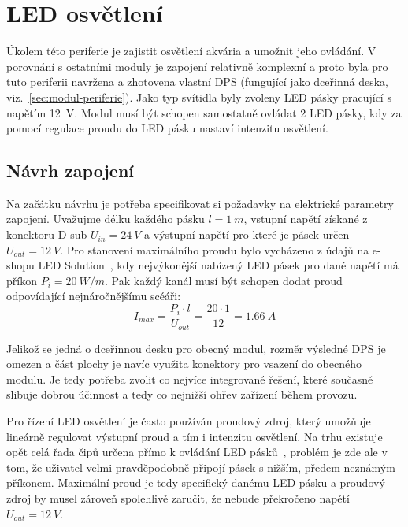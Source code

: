 \section{LED osvětlení}
\label{sec:perif-led-osvetleni}

    Úkolem této periferie je zajistit osvětlení akvária a umožnit jeho ovládání. V porovnání s ostatními moduly je zapojení relativně komplexní a proto byla pro tuto periferii navržena a zhotovena vlastní DPS (fungující jako dceřinná deska, viz.~\ref{sec:modul-periferie}). Jako typ svítidla byly zvoleny LED pásky pracující s napětím \qty{12}{V}. Modul musí být schopen samostatně ovládat 2 LED pásky, kdy za pomocí regulace proudu do LED pásku nastaví intenzitu osvětlení. 

\subsection{Návrh zapojení}
    Na začátku návrhu je potřeba specifikovat si požadavky na elektrické parametry zapojení. Uvažujme délku každého pásku \(l=\qty{1}{m}\), vstupní napětí získané z konektoru D-sub \(U_{in} =\qty{24}{V}\) a výstupní napětí pro které je pásek určen \(U_{out} =\qty{12}{V}\). Pro stanovení maximálního proudu bylo vycházeno z údajů na e-shopu LED Solution~\cite{eshop-ledsolution-svetlo}, kdy nejvýkonější nabízený LED pásek pro dané napětí má příkon \(P_{i}= \qty{20}{W/m}\). Pak každý kanál musí být schopen dodat proud odpovídající nejnáročnějšímu scéáři:
    \begin{equation}  
        I_{max} = \frac{P_{i}\cdot l }{U_{out}} = \frac{20\cdot 1 }{12} = \qty{1.66}{A}
    \end{equation}

    Jelikož se jedná o dceřinnou desku pro obecný modul, rozměr výsledné DPS je omezen a část plochy je navíc využita konektory pro vsazení do obecného modulu. Je tedy potřeba zvolit co nejvíce integrované řešení, které současně slibuje dobrou účinnost a tedy co nejnižší ohřev zařízení během provozu.

    Pro řízení LED osvětlení je často používán proudový zdroj, který umožňuje lineárně regulovat výstupní proud a tím i intenzitu osvětlení. Na trhu existuje opět celá řada čipů určena přímo k ovládání LED pásků~\cite{TI_LED_Drivers}, problém je zde ale v tom, že uživatel velmi pravděpodobně připojí pásek s nižším, předem neznámým příkonem. Maximální proud je tedy specifický danému LED pásku a proudový zdroj by musel zároveň spolehlivě zaručit, že nebude překročeno napětí \(U_{out} =\qty{12}{V} \).

